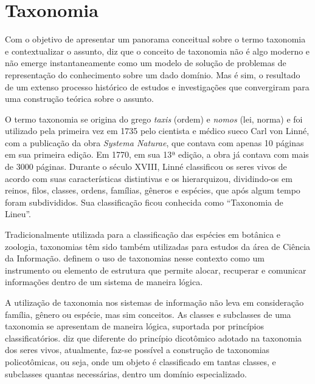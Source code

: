 
\section{Taxonomia}
\label{sec:taxonomia}
Com o objetivo de apresentar um panorama conceitual sobre o termo taxonomia e contextualizar o assunto,  diz que o conceito de taxonomia
não é algo moderno e não emerge instantaneamente como um modelo de solução de problemas de representação do conhecimento sobre um dado domínio. Mas é sim, o resultado de um extenso processo histórico de estudos e investigações que convergiram para uma construção teórica sobre o assunto. 

\par
O termo taxonomia se origina do grego \textit{taxis} (ordem) e \textit{nomos} (lei, norma) e foi utilizado pela primeira vez em 1735 pelo cientista e médico sueco Carl von Linné,
com a publicação da obra \textit{Systema Naturae}, que contava com apenas 10 páginas em sua primeira edição. Em 1770, em sua 13ª edição, a obra já contava com mais de 3000 páginas.
Durante o século XVIII, Linné classificou os seres vivos de acordo com suas características distintivas e os hierarquizou, dividindo-os em reinos, filos, classes, ordens, famílias, gêneros e espécies, que após algum tempo foram subdivididos. Sua classificação ficou conhecida como “Taxonomia de Lineu”.

\par
Tradicionalmente utilizada para a classificação das espécies em botânica e zoologia, taxonomias têm sido também utilizadas para estudos da área de Ciência da Informação.
 definem o uso de taxonomias nesse contexto como um instrumento ou elemento de estrutura que permite alocar,
recuperar e comunicar informações dentro de um sistema de maneira lógica.

\par
A utilização de taxonomia nos sistemas de informação não leva em consideração família, gênero ou espécie, mas sim conceitos.
As classes e subclasses de uma taxonomia se apresentam de maneira lógica, suportada por princípios classificatórios.\cite{campos2012taxonomia}
 diz que diferente do princípio dicotômico adotado na taxonomia dos seres vivos, atualmente, faz-se possível a construção de taxonomias
policotômicas, ou seja, onde um objeto é classificado em tantas classes, e subclasses quantas necessárias, dentro um domínio especializado.

